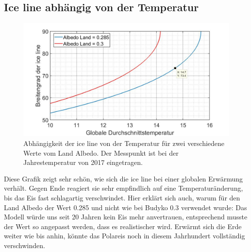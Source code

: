 \begin{refsection}
\subsection{Ice line abhängig von der Temperatur}
\begin{figure}[H]
	\centering
	\includegraphics[width=14cm]{eis/iceline_abh_von_der_Temperatur_mit_Verleich_albedo_0,3.jpg}
	\caption{Abhängigkeit der ice line von der Temperatur für zwei verschiedene Werte vom Land Albedo. Der Messpunkt ist bei der Jahrestemperatur von 2017 eingetragen.}
\end{figure}
Diese Grafik zeigt sehr schön, wie sich die ice line bei einer globalen Erwärmung verhält. Gegen Ende reagiert sie sehr empfindlich auf eine Temperaturänderung, bis das Eis fast schlagartig verschwindet. Hier erklärt sich auch, warum für den Land Albedo der Wert 0.285 und nicht wie bei Budyko 0.3 verwendet wurde: Das Modell würde uns seit 20 Jahren kein Eis mehr anvertrauen, entsprechend musste der Wert so angepasst werden, dass es realistischer wird. Erwärmt sich die Erde weiter wie bis anhin, könnte das Polareis noch in diesem Jahrhundert vollständig verschwinden.

\end{refsection}
